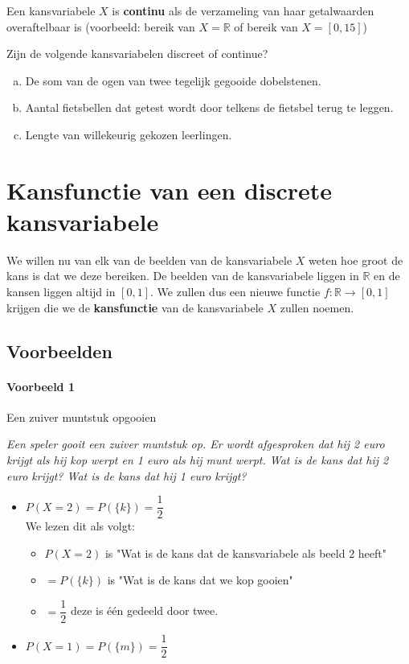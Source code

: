 \documentclass[12pt,twoside]{article}
\begin{document}
Een kansvariabele $X$ is {\bf continu} als de verzameling van haar getalwaarden overaftelbaar is (voorbeeld: bereik van $X = \mathbb{R}$ of bereik van $X = [0,15]$)

\begin{oefening}
Zijn de volgende kansvariabelen discreet of continue?
\begin{enumerate}[(a)]
  \item De som van de ogen van twee tegelijk gegooide dobelstenen.
  \item Aantal fietsbellen dat getest wordt door telkens de fietsbel terug te leggen.
  \item Lengte van willekeurig gekozen leerlingen.
\end{enumerate}
\end{oefening}

\pagebreak
\section{Kansfunctie van een discrete kansvariabele}

We willen nu van elk van de beelden van de kansvariabele $X$ weten hoe groot de kans is dat we deze bereiken. De beelden van de kansvariabele liggen in $\mathbb{R}$ en de kansen liggen altijd in $[0,1]$. We zullen dus een nieuwe functie $f:\mathbb{R}\to[0,1]$ krijgen die we de {\bf kansfunctie} van de kansvariabele $X$ zullen noemen.

\subsection{Voorbeelden}

\paragraph*{Voorbeeld 1} Een zuiver muntstuk opgooien

{\em Een speler gooit een zuiver muntstuk op. Er wordt afgesproken dat hij 2 euro krijgt als hij kop werpt en 1 euro als hij munt werpt. Wat is de kans dat hij 2 euro krijgt? Wat is de kans dat hij 1 euro krijgt?}

\begin{itemize}
  \item $P(X=2)=P(\{k\})=\dfrac{1}{2}$\\
  We lezen dit als volgt:
  \begin{itemize}
    \item $P(X=2)$ is "Wat is de kans dat de kansvariabele als beeld $2$ heeft"
    \item $=P(\{k\})$ is "Wat is de kans dat we kop gooien"
    \item $=\dfrac{1}{2}$ deze is één gedeeld door twee.
  \end{itemize}
  \item $P(X=1)=P(\{m\})=\dfrac{1}{2}$
\end{itemize}
\end{document}
